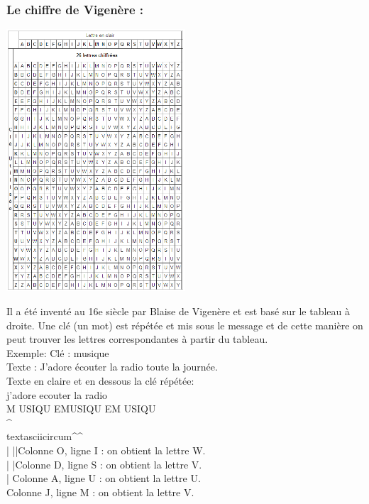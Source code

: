 \documentclass[a4paper,12pt,abstracton,titlepage]{scrartcl}
\begin{document}
\newpage
\subsubsection{Le chiffre de Vigenère :}
\begin{floatingfigure}[r]{8.3cm}
	\includegraphics[width=0.5\textwidth]{./Pictures/tableauVigenere.png}
	\label{vigenere}
\end{floatingfigure}
Il a été inventé au 16e siècle par Blaise de Vigenère et est basé sur le tableau à droite. Une clé (un mot) est répétée et mis sous le message et de cette manière on peut trouver les lettres correspondantes à partir du tableau.\\
Exemple:
Clé : musique\\
Texte : J'adore écouter la radio toute la journée.\\
Texte en claire et en dessous la clé répétée:\\
j'adore ecouter la radio\\
M USIQU EMUSIQU EM USIQU\\
\textasciicircum\ \ \\textasciicircum\textasciicircum\textasciicircum\\
| ||Colonne O, ligne I : on obtient la lettre W.\\
| |Colonne D, ligne S : on obtient la lettre V.\\
| Colonne A, ligne U : on obtient la lettre U.\\
Colonne J, ligne M : on obtient la lettre V.%
\end{document}
